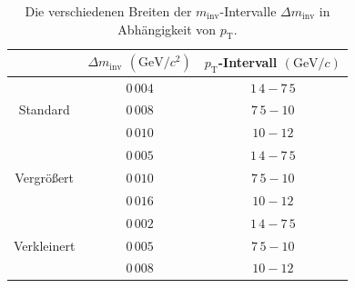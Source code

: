\begin{table}[b!]
\centering
\begin{tabular}{c|c|c|}
\cline{2-3}
                                                          & $\Delta m_\text{inv}$ $\left(\text{GeV}/c^{2}\right)$ & $p_\text{T}$-Intervall $\left(\text{GeV}/c\right)$ \\ \hline
\multicolumn{1}{|c|}{\multirow{3}{*}{Standard}}           & $0\,004$                                              & $1\,4-7\,5$                                        \\ \cline{2-3} 
\multicolumn{1}{|c|}{}                                    & $0\,008$                                              & $7\,5-10$                                          \\ \cline{2-3} 
\multicolumn{1}{|c|}{}                                    & $0\,010$                                              & $10-12$                                            \\ \hline \hline
\multicolumn{1}{|c|}{\multirow{3}{*}{Vergr{\"o}{\ss}ert}} & $0\,005$                                              & $1\,4-7\,5$                                        \\ \cline{2-3} 
\multicolumn{1}{|c|}{}                                    & $0\,010$                                              & $7\,5-10$                                          \\ \cline{2-3} 
\multicolumn{1}{|c|}{}                                    & $0\,016$                                              & $10-12$                                            \\ \hline \hline
\multicolumn{1}{|c|}{\multirow{3}{*}{Verkleinert}}        & $0\,002$                                              & $1\,4-7\,5$                                        \\ \cline{2-3} 
\multicolumn{1}{|c|}{}                                    & $0\,005$                                               & $7\,5-10$                                          \\ \cline{2-3} 
\multicolumn{1}{|c|}{}                                    & $0\,008$                                              & $10-12$                                            \\ \hline
\end{tabular}
\caption{Die verschiedenen Breiten der $m_\text{inv}$-Intervalle $\Delta m_\text{inv}$ in Abhängigkeit von $p_\text{T}$.}
\label{tab:Binning}
\end{table}
